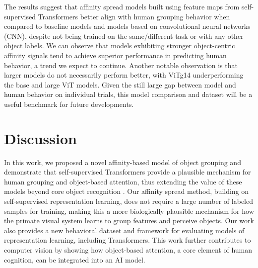 \documentclass{article}
\begin{document}

The results suggest that affinity spread models built using feature maps from self-supervised Transformers better align with human grouping behavior when compared to baseline models and models based on convolutional neural networks (CNN), despite not being trained on the same/different task or with any other object labels. We can observe that models exhibiting stronger object-centric affinity signals tend to achieve superior performance in predicting human behavior, a trend we expect to continue. Another notable observation is that larger models do not necessarily perform better, with ViTg14 underperforming the base and large ViT models. Given the still large gap between model and human behavior on individual trials, this model comparison and dataset will be a useful benchmark for future developments.



\section{Discussion}

In this work, we proposed a novel affinity-based model of object grouping and demonstrate that self-supervised Transformers provide a plausible mechanism for human grouping and object-based attention, thus extending the value of these models beyond core object recognition \citep{vanrullen2001time}. Our affinity spread method, building on self-supervised representation learning, does not require a large number of labeled samples for training, making this a more biologically plausible mechanism for how the primate visual system learns to group features and perceive objects. Our work also provides a new behavioral dataset and framework for evaluating models of representation learning, including Transformers. This work further contributes to computer vision by showing how object-based attention, a core element of human cognition, can be integrated into an AI model.
\end{document}
